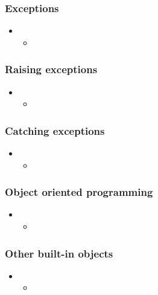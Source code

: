 \begin{frame}[fragile]
%
  \frametitle{Exceptions}
%
  \begin{itemize}
%
  \item 
    \begin{itemize}
    \item
    \end{itemize}
%
  \end{itemize}
%
\end{frame}

\begin{frame}[fragile]
%
  \frametitle{Raising exceptions}
%
  \begin{itemize}
%
  \item 
    \begin{itemize}
    \item
    \end{itemize}
%
  \end{itemize}
%
\end{frame}

\begin{frame}[fragile]
%
  \frametitle{Catching exceptions}
%
  \begin{itemize}
%
  \item 
    \begin{itemize}
    \item
    \end{itemize}
%
  \end{itemize}
%
\end{frame}

\begin{frame}[fragile]
%
  \frametitle{Object oriented programming}
%
  \begin{itemize}
%
  \item 
    \begin{itemize}
    \item
    \end{itemize}
%
  \end{itemize}
%
\end{frame}

\begin{frame}[fragile]
%
  \frametitle{Other built-in objects}
%
  \begin{itemize}
%
  \item 
    \begin{itemize}
    \item
    \end{itemize}
%
  \end{itemize}
%
\end{frame}

